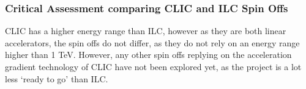 \subsubsection{Critical Assessment comparing CLIC and ILC Spin Offs}

CLIC has a higher energy range than ILC, however as they are both linear accelerators, the spin offs do not differ, as they do not rely on an energy range higher than 1 TeV. However, any other spin offs replying on the acceleration gradient technology of CLIC have not been explored yet, as the project is a lot less `ready to go' than ILC.